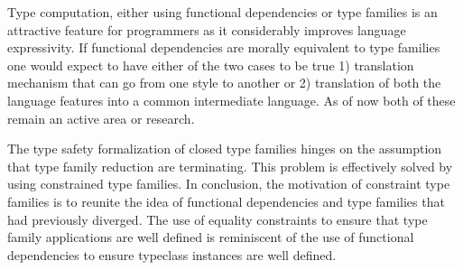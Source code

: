 \documentclass[format=acmsmall,manuscript,review,screen,nonacm,margin=1in,11pt]{acmart}
\begin{document}

Type computation, either using functional dependencies or type families
is an attractive feature for programmers as it considerably improves language expressivity.
If functional dependencies are morally equivalent to type families
one would expect to have either of the two cases to be true
1) translation mechanism that can go from one style to another or 2)
translation of both the language features into a common intermediate language.
As of now both of these remain an active area or research\cite{karachalias_elaboration_2017,sulzmann_understanding_2007}.

The type safety formalization of closed type families hinges on the assumption that
type family reduction are terminating. This problem is effectively solved by using constrained type families.
In conclusion, the motivation of constraint type families is to reunite
the idea of functional dependencies and type families that had previously diverged.
The use of equality constraints to ensure that type family applications are well defined
is reminiscent of the use of functional dependencies to ensure typeclass instances are well defined.
\newpage


\end{document}
